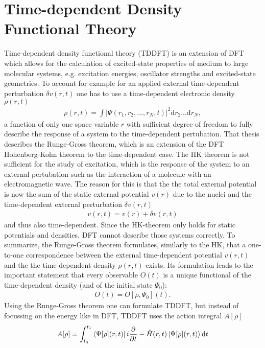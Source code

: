 
\section{Time-dependent Density Functional Theory}
Time-dependent density functional theory (TDDFT) is an extension of DFT which allows for the calculation of excited-state properties of medium to large molecular systems, e.g. excitation energies, oscillator strengths and excited-state geometries.\cite{TDDFT} To account for example for an applied external time-dependent perturbation $δv(r, t)$ one has to use a time-dependent electronic density $\rho(r, t)$
\begin{align}
    \rho(r, t) = \int |\Psi(r_1, r_2, ..., r_N, t)|^2 \mathrm{d}r_2...\mathrm{d}r_N \mathrm{ ,}
\end{align}
a function of only one space variable $r$ with sufficient degree of freedom to fully describe the response of a system to the time-dependent pertubation. That thesis describes the Runge-Gross theorem\cite{Runge-Gross}, which is an extension of the DFT Hohenberg-Kohn theorem to the time-dependent case. The HK theorem is not sufficient for the study of excitation, which is the response of the system to an external pertubation such as the interaction of a molecule with an electromagnetic wave. The reason for this is that the the total external potential is now the sum of the static external potential $v(r)$ due to the nuclei and the time-dependent external perturbation $\delta v(r, t)$ 
\begin{align}
    v(r, t) = v(r) + \delta v(r, t)
\end{align}
and thus also time-dependent. Since the HK-theorem only holds for static potentials and densities, DFT cannot describe those systems correctly. To summarize, the Runge-Gross theorem formulates, similarly to the HK, that a one-to-one correspondence between the external time-dependent potential $v(r, t)$ and the the time-dependent density $\rho(r, t)$ exists. Its formulation leads to the important statement that every observable $O(t)$ is a unique functional of the time-dependent density (and of the initial state $\Psi_0$): 
\begin{align}
    O(t) = O[\rho, \Psi_0](t).
\end{align}
Using the Runge-Gross theorem one can formulate TDDFT, but instead of focussing on the energy like in DFT, TDDFT uses the action integral $A[\rho]$
\begin{align}
    A[\rho] = \int_{t_0}^{t_1}\bra{\Psi[\rho](r, t)}i\frac{\partial}{\partial t} - \hat{H}(r, t) \ket{\Psi[\rho](r, t)}\mathrm{d}t
\end{align}
